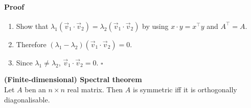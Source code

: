 \documentclass{article}
\begin{document}
\paragraph*{Proof}
\begin{enumerate}
    \item Show that $\lambda_1(\vec v_1 \cdot \vec v_2)=\lambda_2(\vec v_1\cdot\vec v_2)$ by using $x\cdot y =x^\intercal y$ and $A^\intercal =A$.
    \item Therefore $(\lambda_1-\lambda_2)(\vec v_1 \cdot \vec v_2)=0$.
    \item Since $\lambda_1\not=\lambda_2$, $\vec v_1 \cdot \vec v_2=0$. $\square$
\end{enumerate}
\begin{theorem}
    \textbf{(Finite-dimensional) Spectral theorem}\\
    Let $A$ ben an $n\times n$ real matrix. Then $A$ is symmetric iff it is orthogonally diagonalisable.
\end{theorem}
\end{document}
